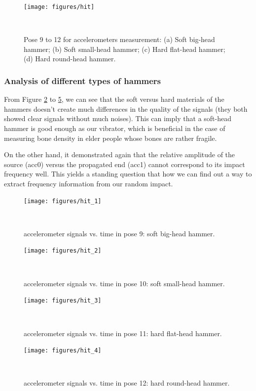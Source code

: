 \documentclass{sigchi}
\begin{document}
\begin{figure}
  \centering
  \texttt{[image: figures/hit]}
  \caption{Pose 9 to 12 for accelerometers measurement: (a) Soft big-head hammer; (b) Soft small-head hammer; (c) Hard flat-head hammer; (d) Hard round-head hammer.}
    ~\label{fig:hit}
\end{figure}

\subsubsection{Analysis of different types of hammers} 

From Figure \ref{fig:hit_1} to \ref{fig:hit_4}, we can see that the soft versus hard materials of the hammers doesn't create much differences in the quality of the signals (they both showed clear signals without much noises). This can imply that a soft-head hammer is good enough as our vibrator, which is beneficial in the case of measuring bone density in elder people whose bones are rather fragile. 

On the other hand, it demonstrated again that the relative amplitude of the source (acc0) versus the propagated end (acc1) cannot correspond to its impact frequency well. This yields a standing question that how we can find out a way to extract frequency information from our random impact.

\begin{figure}
  \centering
  \texttt{[image: figures/hit\_1]}
  \caption{accelerometer signals vs. time in pose 9: soft big-head hammer.}
    ~\label{fig:hit_1}
\end{figure}

\begin{figure}
  \centering
  \texttt{[image: figures/hit\_2]}
  \caption{accelerometer signals vs. time in pose 10: soft small-head hammer.}
    ~\label{fig:hit_2}
\end{figure}

\begin{figure}
  \centering
  \texttt{[image: figures/hit\_3]}
  \caption{accelerometer signals vs. time in pose 11: hard flat-head hammer.}
    ~\label{fig:hit_3}
\end{figure}

\begin{figure}
  \centering
  \texttt{[image: figures/hit\_4]}
  \caption{accelerometer signals vs. time in pose 12: hard round-head hammer.}
    ~\label{fig:hit_4}
\end{figure}
\end{document}
